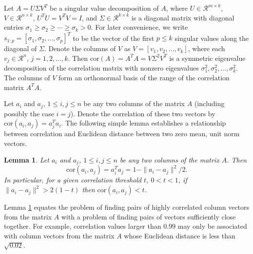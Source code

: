 \documentclass[article]{jss}
\newtheorem{lemma}[theorem]{Lemma}
\newenvironment{proof}[1][Proof]{\begin{trivlist}
\item[\hskip \labelsep {\bfseries #1}]}{\end{trivlist}}
\numberwithin{algorithmctr}{section}
\begin{document}
Let $A=U\Sigma V^T$ be a singular value decomposition of $A$, where
$U\in\mathcal{R}^{m\times k}$, $V\in\mathcal{R}^{n\times k}$,
$U^TU = V^TV = I$,
and $\Sigma\in\mathcal{R}^{k\times k}$ is a diagonal matrix with
diagonal entries $\sigma_1 \ge \sigma_2 \ge \cdots \ge \sigma_k > 0$.  For
later convenience, we write $s_{1:p}=[\sigma_1, \sigma_2, \ldots, \sigma_p]^T$
to be the vector of the first $p\le k$ singular values along the diagonal of
$\Sigma$.  Denote the columns of $V$ as $V=[v_1, v_2, \ldots, v_k]$, where each
$v_j\in\mathcal{R}^n$, $j=1,2,\ldots,k$.  Then $\mathrm{cor}(A) = A^TA =
V\Sigma^2 V^T$ is a symmetric eigenvalue decomposition of the correlation
matrix with nonzero eigenvalues $\sigma_1^2, \sigma_2^2, \ldots, \sigma_k^2$.
The columns of $V$ form an orthonormal basis of the range of the
correlation matrix $A^TA$.

Let $a_i$ and $a_j$, $1\le i,j\le n$ be any two columns of the matrix $A$
(including possibly the case $i=j$). Denote the correlation of these two
vectors by $\mathrm{cor}(a_i,a_j) = a_j^T a_i$.  The following simple lemma
establishes a relationship between correlation and Euclidean distance between
two zero mean, unit norm vectors.

\begin{lemma}
\label{distlemma}
Let $a_i$ and $a_j$, $1\le i,j\le n$ be any two columns of the matrix
$A$. Then
\begin{equation}\label{cordist}
\mathrm{cor}(a_i,a_j) = a_i^Ta_j = 1 - \|a_i - a_j\|^2/2.
\end{equation}
In particular, for a given correlation threshold $t$, $0<t<1$, if
$\|a_i - a_j\|^2 > 2(1-t)$ then
$\mathrm{cor}(a_i, a_j) < t$.
\end{lemma}

Lemma \ref{distlemma} equates the problem of finding pairs of highly correlated
column vectors from the matrix $A$ with a problem of finding pairs of vectors
sufficiently close together. For example, correlation values larger than 0.99
may only be associated with column vectors from the matrix $A$ whose Euclidean
distance is less than $\sqrt{0.02}$.
\end{document}
